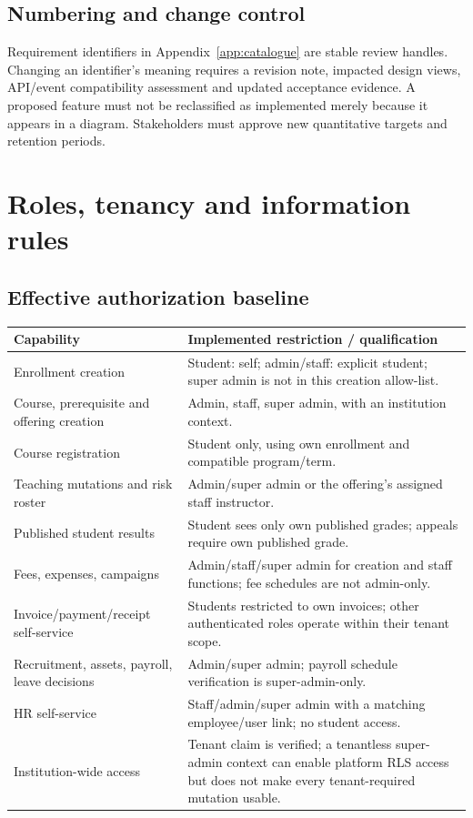 \documentclass[10pt,a4paper]{article}
\begin{document}
\subsection{Numbering and change control}
Requirement identifiers in Appendix~\ref{app:catalogue} are stable review handles.
Changing an identifier's meaning requires a revision note, impacted design views,
API/event compatibility assessment and updated acceptance evidence. A proposed
feature must not be reclassified as implemented merely because it appears in a
diagram. Stakeholders must approve new quantitative targets and retention periods.

\clearpage
\section{Roles, tenancy and information rules}
\subsection{Effective authorization baseline}
\begin{tabularx}{\textwidth}{@{}L{43mm}Y@{}}
\toprule Capability & Implemented restriction / qualification\\\midrule
Enrollment creation & Student: self; admin/staff: explicit student; super admin is not in this creation allow-list.\\
Course, prerequisite and offering creation & Admin, staff, super admin, with an institution context.\\
Course registration & Student only, using own enrollment and compatible program/term.\\
Teaching mutations and risk roster & Admin/super admin or the offering's assigned staff instructor.\\
Published student results & Student sees only own published grades; appeals require own published grade.\\
Fees, expenses, campaigns & Admin/staff/super admin for creation and staff functions; fee schedules are not admin-only.\\
Invoice/payment/receipt self-service & Students restricted to own invoices; other authenticated roles operate within their tenant scope.\\
Recruitment, assets, payroll, leave decisions & Admin/super admin; payroll schedule verification is super-admin-only.\\
HR self-service & Staff/admin/super admin with a matching employee/user link; no student access.\\
Institution-wide access & Tenant claim is verified; a tenantless super-admin context can enable platform RLS access but does not make every tenant-required mutation usable.\\
\bottomrule
\end{tabularx}
\end{document}
